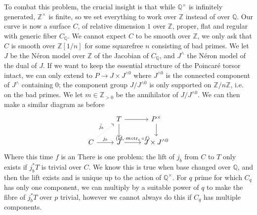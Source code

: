 \documentclass[12pt]{article}
\newcommand{\Z}{\mathbb{Z}}
\newcommand{\Q}{\mathbb{Q}}
\DeclareMathOperator{\id}{id}
\DeclareMathOperator{\tr}{tr}
\theoremstyle{plain}
\theoremstyle{definition}
\theoremstyle{remark}
\begin{document}
To combat this problem, the crucial insight is that while $\Q^\times$ is infinitely generated, $\Z^\times$ is finite, so we set everything to work over $\Z$ instead of over $\Q$. Our curve is now a surface $C$, of relative dimension $1$ over $\Z$, proper, flat and regular with generic fiber $C_\Q$. We cannot expect $C$ to be smooth over $\Z$, we only ask that $C$ is smooth over $\Z[1/n]$ for some squarefree $n$ consisting of bad primes. We let $J$ be the N\'eron model over $\Z$ of the Jacobian of $C_\Q$, and $J^\wedge$ the N\'eron model of the dual of $J$. If we want to keep the essential structure of the Poincar\'e torsor intact, we can only extend to $P \to J \times J^{\wedge 0}$ where $J^{\wedge 0}$ is the connected component of $J^\wedge$ containing $0$; the component group $J/J^{\wedge 0}$ is only supported on $\Z/n\Z$, i.e. on the bad primes. We let $m\in \Z_{>0}$ be the annihilator of $J/J^{\wedge 0}$. We can then make a similar diagram as before
\[\begin{tikzcd} %
                                                & T \arrow[d] \arrow[r]                   & P^\times \arrow[d]      \\
C \arrow[ru, "\Tilde{j_b}", dotted] \arrow[r, "j_b"] & J \arrow[r, "{(\id,\cdot m \circ\tr_c \circ f)}"] & J \times J^{\wedge 0}
\end{tikzcd}\]
Where this time $f$ is an 
There is one problem: the lift of $j_b$ from $C$ to $T$ only exists if $j_b^* T$ is trivial over $C$. We know this is true when base changed over $\Q$, and then the lift exists and is unique up to the action of $\Q^\times$. For $q$ prime for which $C_q$ has only one component, we can multiply by a suitable power of $q$ to make the fibre of $j_b^* T$ over $p$ trivial, however we cannot always do this if $C_q$ has multiple components.
\end{document}
